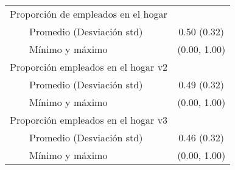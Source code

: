 \begin{longtable}{lc}
Proporción de empleados en el hogar &  \\ 
    Promedio (Desviación std) & 0.50 (0.32) \\ 
    Mínimo y máximo & (0.00, 1.00) \\ 
Proporción empleados en el hogar v2 &  \\ 
    Promedio (Desviación std) & 0.49 (0.32) \\ 
    Mínimo y máximo & (0.00, 1.00) \\ 
Proporción empleados en el hogar v3 &  \\ 
    Promedio (Desviación std) & 0.46 (0.32) \\ 
    Mínimo y máximo & (0.00, 1.00) \\ 
\bottomrule
\end{longtable}

